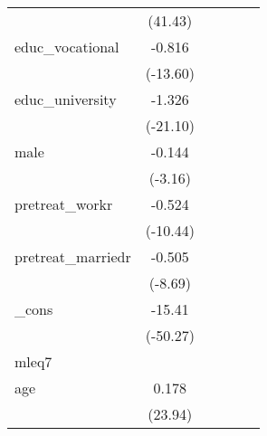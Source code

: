 {\begin{tabular}{l*{5}{c}}
            &     (41.43)         &                     &                     &                     &                     \\
[1em]
educ\_vocational&      -0.816\sym{***}&                     &                     &                     &                     \\
            &    (-13.60)         &                     &                     &                     &                     \\
[1em]
educ\_university&      -1.326\sym{***}&                     &                     &                     &                     \\
            &    (-21.10)         &                     &                     &                     &                     \\
[1em]
male        &      -0.144\sym{**} &                     &                     &                     &                     \\
            &     (-3.16)         &                     &                     &                     &                     \\
[1em]
pretreat\_workr&      -0.524\sym{***}&                     &                     &                     &                     \\
            &    (-10.44)         &                     &                     &                     &                     \\
[1em]
pretreat\_marriedr&      -0.505\sym{***}&                     &                     &                     &                     \\
            &     (-8.69)         &                     &                     &                     &                     \\
[1em]
\_cons      &      -15.41\sym{***}&                     &                     &                     &                     \\
            &    (-50.27)         &                     &                     &                     &                     \\
\hline
mleq7       &                     &                     &                     &                     &                     \\
age         &       0.178\sym{***}&                     &                     &                     &                     \\
            &     (23.94)         &                     &                     &                     &                     \\

\end{tabular}}
